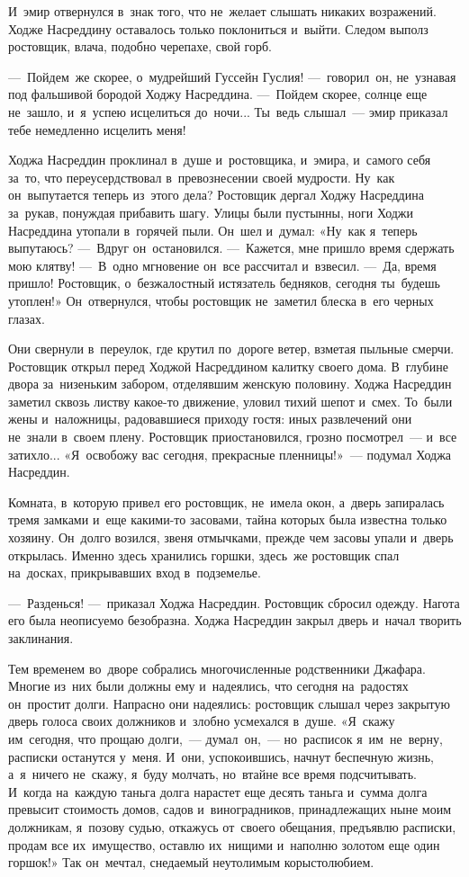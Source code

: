 \documentclass[12pt,a4paper]{book}
\begin{document}
И~эмир отвернулся в~знак того, что не~желает слышать никаких возражений. Ходже Насреддину оставалось только поклониться и~выйти. Следом выполз ростовщик, влача, подобно черепахе, свой горб.

—~Пойдем~же скорее, о~мудрейший Гуссейн Гуслия! —~говорил~он, не~узнавая под фальшивой бородой Ходжу Насреддина. —~Пойдем скорее, солнце еще не~зашло, и~я~успею исцелиться до~ночи... Ты~ведь слышал~— эмир приказал тебе немедленно исцелить меня!

Ходжа Насреддин проклинал в~душе и~ростовщика, и~эмира, и~самого себя за~то, что переусердствовал в~превознесении своей мудрости. Ну~как он~выпутается теперь из~этого дела? Ростовщик дергал Ходжу Насреддина за~рукав, понуждая прибавить шагу. Улицы были пустынны, ноги Ходжи Насреддина утопали в~горячей пыли. Он~шел и~думал: «Ну~как я~теперь выпутаюсь? —~Вдруг он~остановился. —~Кажется, мне пришло время сдержать мою клятву! —~В~одно мгновение он~все рассчитал и~взвесил. —~Да, время пришло! Ростовщик, о~безжалостный истязатель бедняков, сегодня ты~будешь утоплен!» Он~отвернулся, чтобы ростовщик не~заметил блеска в~его черных глазах.

Они свернули в~переулок, где крутил по~дороге ветер, взметая пыльные смерчи. Ростовщик открыл перед Ходжой Насреддином калитку своего дома. В~глубине двора за~низеньким забором, отделявшим женскую половину. Ходжа Насреддин заметил сквозь листву какое-то движение, уловил тихий шепот и~смех. То~были жены и~наложницы, радовавшиеся приходу гостя: иных развлечений они не~знали в~своем плену. Ростовщик приостановился, грозно посмотрел~— и~все затихло... «Я~освобожу вас сегодня, прекрасные пленницы!»~— подумал Ходжа Насреддин.

Комната, в~которую привел его ростовщик, не~имела окон, а~дверь запиралась тремя замками и~еще какими-то засовами, тайна которых была известна только хозяину. Он~долго возился, звеня отмычками, прежде чем засовы упали и~дверь открылась. Именно здесь хранились горшки, здесь~же ростовщик спал на~досках, прикрывавших вход в~подземелье.

—~Разденься! —~приказал Ходжа Насреддин. Ростовщик сбросил одежду. Нагота его была неописуемо безобразна. Ходжа Насреддин закрыл дверь и~начал творить заклинания.

Тем временем во~дворе собрались многочисленные родственники Джафара. Многие из~них были должны ему и~надеялись, что сегодня на~радостях он~простит долги. Напрасно они надеялись: ростовщик слышал через закрытую дверь голоса своих должников и~злобно усмехался в~душе. «Я~скажу им~сегодня, что прощаю долги,~— думал~он,~— но~расписок я~им~не~верну, расписки останутся у~меня. И~они, успокоившись, начнут беспечную жизнь, а~я~ничего не~скажу, я~буду молчать, но~втайне все время подсчитывать. И~когда на~каждую таньга долга нарастет еще десять таньга и~сумма долга превысит стоимость домов, садов и~виноградников, принадлежащих ныне моим должникам, я~позову судью, откажусь от~своего обещания, предъявлю расписки, продам все их~имущество, оставлю их~нищими и~наполню золотом еще один горшок!» Так он~мечтал, снедаемый неутолимым корыстолюбием.
\end{document}
